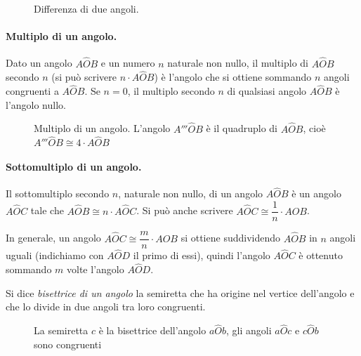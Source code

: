 \begin{inaccessibleblock}
 \begin{figure}[htb]
\centering
\caption{Differenza di due angoli.}\label{fig:1.33}
\end{figure}
\end{inaccessibleblock}

\paragraph{Multiplo di un angolo.} Dato un angolo $A\widehat{O}B$ e 
un numero $n$ naturale non nullo, il multiplo di $A\widehat{O}B$ 
secondo $n$ (si può scrivere $n\cdot A\widehat{O}B$) è l'angolo che 
si ottiene sommando $n$ angoli congruenti a $A\widehat{O}B$. Se 
$n=0$, il multiplo secondo $n$ di qualsiasi angolo $A\widehat{O}B$ è 
l'angolo nullo.


\begin{inaccessibleblock}
 \begin{figure}[htb]
\centering
\caption{Multiplo di un angolo. L'angolo $A'''\widehat{O}B$ è il 
quadruplo di $A\widehat{O}B$, cioè $A'''\widehat{O}B \cong 4\cdot 
A\widehat{O}B$}
\end{figure}
\end{inaccessibleblock}

\paragraph{Sottomultiplo di un angolo.} Il sottomultiplo secondo $n$, 
naturale non nullo, di un angolo $A\widehat{O}B$ è un angolo 
$A\widehat{O}C$ tale che $A\widehat{O}B \cong n\cdot A\widehat{O}C$. 
Si può anche scrivere $A\widehat{O}C\cong \dfrac{1}{n}\cdot 
A\widehat{O}B$.

In generale, un angolo $A\widehat{O}C\cong\dfrac{m}{n}\cdot 
A\widehat{O}B$ si ottiene suddividendo $A\widehat{O}B$ in $n$ angoli 
uguali (indichiamo con $A\widehat{O}D$ il primo di essi), quindi 
l'angolo $A\widehat{O}C$ è ottenuto sommando $m$ volte l'angolo 
$A\widehat{O}D$.

\begin{definizione}
Si dice \emph{bisettrice di un angolo} la semiretta che ha origine 
nel vertice dell'angolo e che lo divide in due angoli tra loro 
congruenti.
\end{definizione}


\begin{inaccessibleblock}
 \begin{figure}[htb]
\centering
\caption{La semiretta $c$ è la bisettrice dell'angolo 
$a\widehat{O}b$, gli angoli $a\widehat{O}c$ e $c\widehat{O}b$ sono 
congruenti}
\end{figure}
\end{inaccessibleblock}

